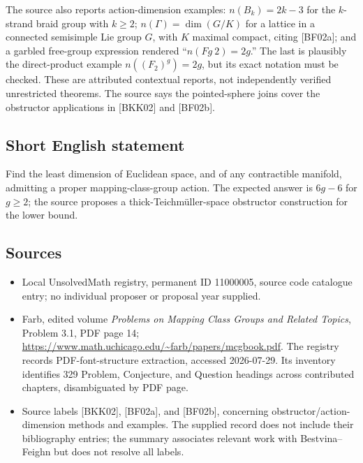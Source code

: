 \documentclass[11pt]{article}
\begin{document}
The source also reports action-dimension examples: $n(B_k)=2k-3$ for the $k$-strand braid group with $k\ge2$; $n(\Gamma)=\dim(G/K)$ for a lattice in a connected semisimple Lie group $G$, with $K$ maximal compact, citing [BF02a]; and a garbled free-group expression rendered ``$n(Fg\ 2)=2g$.'' The last is plausibly the direct-product example $n((F_2)^g)=2g$, but its exact notation must be checked. These are attributed contextual reports, not independently verified unrestricted theorems. The source says the pointed-sphere joins cover the obstructor applications in [BKK02] and [BF02b].
\subsection{Short English statement}
Find the least dimension of Euclidean space, and of any contractible manifold, admitting a proper mapping-class-group action. The expected answer is $6g-6$ for $g\ge2$; the source proposes a thick-Teichm\"uller-space obstructor construction for the lower bound.
\subsection{Sources}
\begin{itemize}
\item Local UnsolvedMath registry, permanent ID 11000005, source code catalogue entry; no individual proposer or proposal year supplied.
\item Farb, edited volume \emph{Problems on Mapping Class Groups and Related Topics}, Problem 3.1, PDF page 14; \url{https://www.math.uchicago.edu/~farb/papers/mcgbook.pdf}. The registry records PDF-font-structure extraction, accessed 2026-07-29. Its inventory identifies 329 Problem, Conjecture, and Question headings across contributed chapters, disambiguated by PDF page.
\item Source labels [BKK02], [BF02a], and [BF02b], concerning obstructor/action-dimension methods and examples. The supplied record does not include their bibliography entries; the summary associates relevant work with Bestvina--Feighn but does not resolve all labels.
\end{itemize}
\end{document}
